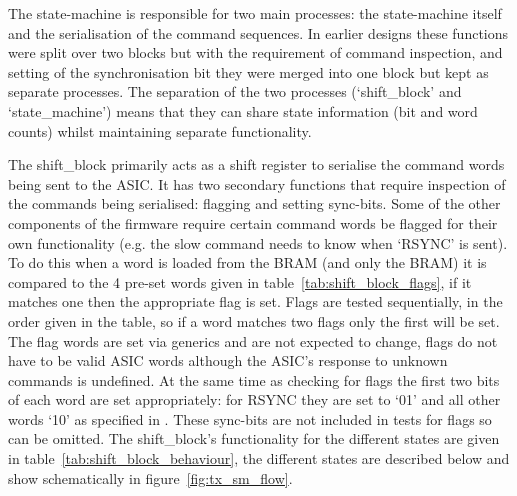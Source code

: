 \documentclass[]{article}
\begin{document}

    
    The state-machine is responsible for two main processes: the state-machine itself and the serialisation of the command sequences. In earlier designs these functions were split over two blocks but with the requirement of command inspection, and setting of the synchronisation bit they were merged into one block but kept as separate processes. The separation of the two processes (`shift\_block' and `state\_machine') means that they can share state information (bit and word counts) whilst maintaining separate functionality. 
    
    The shift\_block primarily acts as a shift register to serialise the command words being sent to the ASIC. It has two secondary functions that require inspection of the commands being serialised: flagging and setting sync-bits. Some of the other components of the firmware require certain command words be flagged for their own functionality (e.g. the slow command needs to know when `RSYNC' is sent). To do this when a word is loaded from the BRAM (and only the BRAM) it is compared to the 4 pre-set words given in table~\ref{tab:shift_block_flags}, if it matches one then the appropriate flag is set. Flags are tested sequentially, in the order given in the table, so if a word matches two flags only the first will be set. The flag words are set via generics and are not expected to change, flags do not have to be valid ASIC words although the ASIC's response to unknown commands is undefined. At the same time as checking for flags the first two bits of each word are set appropriately: for RSYNC they are set to `01' and all other words `10' as specified in \cite{LPD DESIGN MANUAL THING}. These sync-bits are not included in tests for flags so can be omitted. The shift\_block's functionality for the different states are given in table~\ref{tab:shift_block_behaviour}, the different states are described below and show schematically in figure~\ref{fig:tx_sm_flow}.
\end{document}
